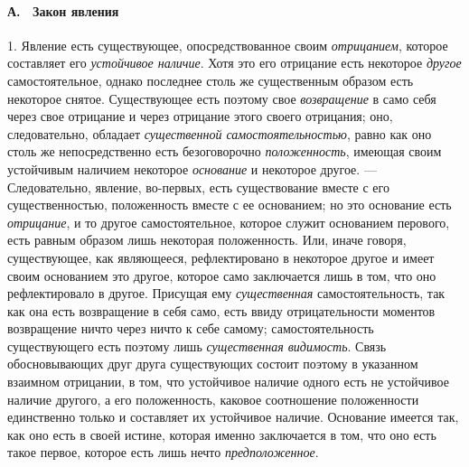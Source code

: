 \paragraph[А. \ Закон явления]{А. \ Закон явления}
1. Явление есть существующее, опосредствованное
своим {\em отрицанием}, которое составляет его
{\em устойчивое наличие}. Хотя это его отрицание есть
некоторое {\em другое} самостоятельное, однако
последнее столь же существенным образом есть некоторое снятое. Существующее
есть поэтому свое {\em возвращение} в само себя через
свое отрицание и через отрицание этого своего отрицания; оно,
следовательно, обладает {\em существенной
самостоятельностью}, равно как оно столь же непосредственно есть
безоговорочно {\em положенность}, имеющая своим
устойчивым наличием некоторое {\em основание} и
некоторое другое. — Следовательно, явление, во-первых, есть существование
вместе с его существенностью, положенность вместе с ее основанием; но это
основание есть {\em отрицание}, и то другое
самостоятельное, которое служит основанием перового, есть равным образом
лишь некоторая положенность. Или, иначе говоря, существующее, как
являющееся, рефлектировано в некоторое другое и имеет своим основанием это
другое, которое само заключается лишь в том, что оно рефлектировало в
другое. Присущая ему {\em существенная}
самостоятельность, так как она есть возвращение в себя само, есть ввиду
отрицательности моментов возвращение ничто через ничто к себе самому;
самостоятельность существующего есть поэтому лишь
{\em существенная видимость}. Связь обосновывающих друг
друга существующих состоит поэтому в указанном взаимном отрицании, в том,
что устойчивое наличие одного есть не устойчивое наличие другого, а его
положенность, каковое соотношение положенности единственно только и
составляет их устойчивое наличие. Основание имеется так, как оно есть в
своей истине, которая именно заключается в том, что оно есть такое первое,
которое есть лишь нечто {\em предположенное}.

